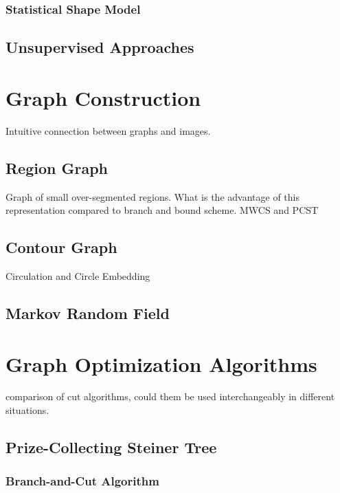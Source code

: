 \documentclass{SMBV12}
\begin{document}
\subsubsection{Statistical Shape Model}

\cite{leventon2000statistical}

\subsection{Unsupervised Approaches}



\section{Graph Construction}

Intuitive connection between graphs and images.

\subsection{Region Graph}

Graph of small over-segmented regions. What is the advantage of this representation compared to branch and bound scheme. MWCS and PCST

\subsection{Contour Graph}

Circulation and Circle Embedding

\subsection{Markov Random Field}

\section{Graph Optimization Algorithms}

comparison of cut algorithms, could them be used interchangeably in different situations.

\subsection{Prize-Collecting Steiner Tree}

\cite{ljubic2006algorithmic}

\subsubsection{Branch-and-Cut Algorithm}
\end{document}
